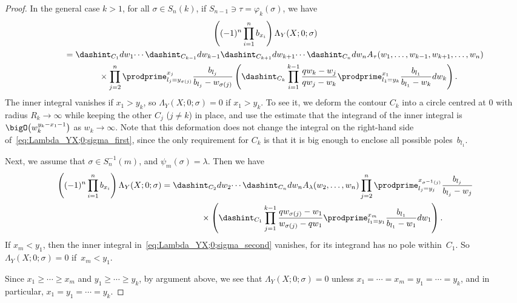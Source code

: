 \begin{proof}
 In the general case $k > 1$, for all $\sigma \in S_n(k)$, if $S_{n - 1} \ni \tau = \varphi_k(\sigma)$, we have
 \begin{gather}
 \left( (-1)^n \prod^n_{i = 1} b_{x_i} \right) \Lambda_Y(X; 0; \sigma) \nonumber\\
\qquad{} = \dashint_{C_1} dw_1 \dotsi \dashint_{C_{k - 1}} dw_{k - 1} \dashint_{C_{k + 1}} dw_{k + 1} \dotsi \dashint_{C_n} dw_n A_{\tau}(w_1, \dotsc, w_{k - 1}, w_{k + 1}, \dotsc, w_n) \nonumber\\
 \qquad\quad{} \times \prod^n_{j = 2} \prodprime^{x_j}_{l_j = y_{\sigma(j)}} \frac{b_{l_j}}{b_{l_j} - w_{\sigma(j)}} \left( \dashint_{C_k} \prod^{k - 1}_{i = 1} \frac{q w_k - w_j}{q w_j - w_k} \prodprime^{x_1}_{l_1 = y_k} \frac{b_{l_1}}{b_{l_1} - w_k} dw_k \right).\label{eq:Lambda_YX;0;sigma_first}
 \end{gather}
 The inner integral vanishes if $x_1 > y_k$, so $\Lambda_Y(X; 0; \sigma) = 0$ if $x_1 > y_k$. To see it, we deform the contour $C_k$ into a circle centred at $0$ with radius $R_k \to \infty$ while keeping the other $C_j$ ($j \neq k$) in place, and use the estimate that the integrand of the inner integral is $\bigO\big(w^{y_k - x_1 - 1}_k\big)$ as $w_k \to \infty$. Note that this deformation does not change the integral on the right-hand side of~\eqref{eq:Lambda_YX;0;sigma_first}, since the only requirement for $C_k$ is that it is big enough to enclose all possible poles~$b_{l_1}$.

 Next, we assume that $\sigma \in S^{-1}_n(m)$, and $\psi_m(\sigma) = \lambda$. Then we have
 \begin{gather}
 \left( (-1)^n \prod^n_{i = 1} b_{x_i} \right) \Lambda_Y(X; 0; \sigma) = \dashint_{C_2} dw_2 \dotsi \dashint_{C_n} dw_n A_{\lambda}(w_2, \dotsc, w_n) \prod^n_{j = 2} \prodprime^{x_{\sigma^{-1}(j)}}_{l_j = y_j} \frac{b_{l_j}}{b_{l_j} - w_j}\nonumber \\
 \hphantom{\left( (-1)^n \prod^n_{i = 1} b_{x_i} \right) \Lambda_Y(X; 0; \sigma) =}{}
 \times \left( \dashint_{C_1} \prod^{k - 1}_{j = 1} \frac{q w_{\sigma(j)} - w_1}{w_{\sigma(j)} - q w_1} \prodprime^{x_m}_{l_1 = y_1} \frac{b_{l_1}}{b_{l_1} - w_1} dw_1 \right).\label{eq:Lambda_YX;0;sigma_second}
 \end{gather}
 If $x_m < y_1$, then the inner integral in~\eqref{eq:Lambda_YX;0;sigma_second} vanishes, for its integrand has no pole within~$C_1$. So~$\Lambda_Y(X; 0; \sigma) = 0$ if~$x_m < y_1$.

 Since $x_1 \geq \dotsb \geq x_m$ and $y_1 \geq \dotsb \geq y_k$, by argument above, we see that $\Lambda_Y(X; 0; \sigma) = 0$ unless $x_1 = \dotsb = x_m = y_1 = \dotsb = y_k$, and in particular, $x_1 = y_1 = \dotsb = y_k$.


\end{proof}

